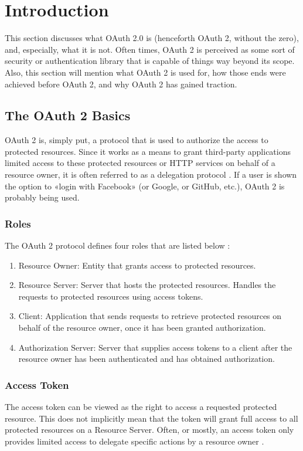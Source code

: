 \section{Introduction}

This section discusses what OAuth 2.0 is (henceforth OAuth 2, without the zero), and, especially, what it is not. Often times, OAuth 2 is perceived as some sort of security or authentication library that is capable of things way beyond its scope. Also, this section will mention what OAuth 2 is used for, how those ends were achieved before OAuth 2, and why OAuth 2 has gained traction. 

\subsection{The OAuth 2 Basics}

OAuth 2 is, simply put, a protocol that is used to authorize the access to protected resources. Since it works as a means to grant third-party applications limited access to these protected resources or HTTP services on behalf of a resource owner, it is often referred to as a delegation protocol \cite[p. 3]{oauth2-in-action}. If a user is shown the option to «login with Facebook» (or Google, or GitHub, etc.), OAuth 2 is probably being used.

\subsubsection{Roles}

The OAuth 2 protocol defines four roles that are listed below \cite{RFC6749}:

\begin{enumerate}
\item Resource Owner: Entity that grants access to protected resources.
\item Resource Server: Server that hosts the protected resources. Handles the requests to protected resources using access tokens.
\item Client: Application that sends requests to retrieve protected resources on behalf of the resource owner, once it has been granted authorization.
\item Authorization Server: Server that supplies access tokens to a client after the resource owner has been authenticated and has obtained authorization.
\end{enumerate}

\subsubsection{Access Token}
The access token can be viewed as the right to access a requested protected resource. This does not implicitly mean that the token will grant full access to all protected resources on a Resource Server. Often, or mostly, an access token only provides limited access to delegate specific actions by a resource owner \cite[p. 4]{oauth2-in-action}.

